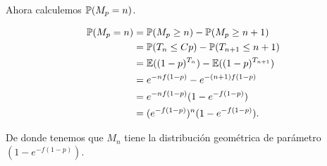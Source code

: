    Ahora calculemos $\mathbb{P}(M_p = n)$.\pn
    
    \begin{align}
        \mathbb{P}(M_p = n)    &=  \mathbb{P}(M_p \geq n) - \mathbb{P}(M_p \geq n + 1)       \\
                        &=  \mathbb{P}(T_n \leq Cp)- \mathbb{P}(T_{n+1} \leq n + 1)   \\
                        &=  \mathbb{E}((1-p)^{T_n}) - \mathbb{E}((1-p)^{T_{n+1}})       \\
                        &=  e^{-nf(1-p)}    - e^{-(n+1)f(1-p)}          \\
                        &=  e^{-nf(1-p)} (1- e^{-f(1-p)})               \\
                        &=  (e^{-f(1-p)})^n (1- e^{-f(1-p)}).           
    \end{align}\pn
    
    De donde tenemos que $M_n$ tiene la distribución geométrica de parámetro $(1- e^{-f(1-p)})$.